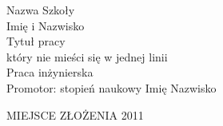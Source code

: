 \documentclass[polish,12pt,oneside]{mwbk}
\begin{document}

\begin{titlepage}
\begin{center}
{\Large Nazwa Szkoły}\\[16em]

\textsf{\huge Imię i Nazwisko}\\[1em]
\textsf{\Huge Tytuł pracy\\który nie mieści się w jednej linii}\\[2em]
{\Large Praca inżynierska}\\[1em]
{\Large Promotor: stopień naukowy Imię Nazwisko}

\vfill

{\Large MIEJSCE ZŁOŻENIA 2011}
\end{center}
\end{titlepage}

\addtocounter{page}{1}     %
\setcounter{tocdepth}{3}   %
\tableofcontents           %

          





\cleardoublepage     %
\listoffigures       %

\cleardoublepage     %
\printindex          %
\end{document}
